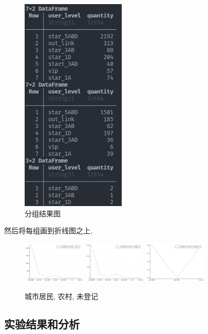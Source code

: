 \documentclass[a4paper]{article}
\begin{document}
\begin{figure}[ht]
 \centering
 \includegraphics[width=5cm]{images/网络分组.png}
 \caption{分组结果图}
 \label{fig:netgroup}
\end{figure}

然后将每组画到折线图之上,
\begin{figure}
    \centering
    \includegraphics[width=3cm]{images/city.png}
    \label{fig:city}
    \includegraphics[width=3cm]{images/village.png}
    \label{fig:village}
    \includegraphics[width=3cm]{images/unknown.png}
    \caption{城市居民, 农村, 未登记}
    \label{fig:unknown}
\end{figure}

\subsection{实验结果和分析}\label{sub:ptxeva}
\end{document}
